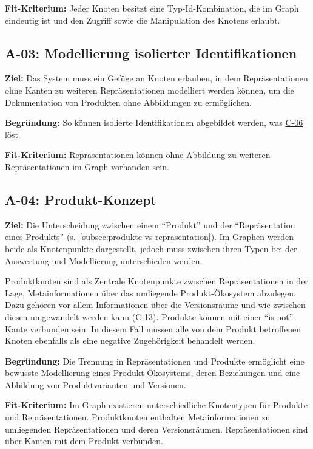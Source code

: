 \textbf{Fit-Kriterium:}
Jeder Knoten besitzt eine Typ-Id-Kombination, die im Graph eindeutig ist und den Zugriff sowie die Manipulation des Knotens erlaubt.

\subsection{A-03: Modellierung isolierter Identifikationen}\label{subsec:req-nodes-without-identification}

\textbf{Ziel:}
Das System muss ein Gefüge an Knoten erlauben, in dem Repräsentationen ohne Kanten zu weiteren Repräsentationen modelliert werden können, um die Dokumentation von Produkten ohne Abbildungen zu ermöglichen.

\textbf{Begründung:}
So können isolierte Identifikationen abgebildet werden, was \hyperref[subsec:c-06-falle-ohne-aktion-konnen-nicht-dokumentiert-werden]{C-06} löst.

\textbf{Fit-Kriterium:}
Repräsentationen können ohne Abbildung zu weiteren Repräsentationen im Graph vorhanden sein.

\subsection{A-04: Produkt-Konzept}\label{subsec:req-product-concept}

\textbf{Ziel:}
Die Unterscheidung zwischen einem \enquote{Produkt} und der \enquote{Repräsentation eines Produkts} (s.\ \autoref{subsec:produkte-vs-reprasentation}).
Im Graphen werden beide als Knotenpunkte dargestellt, jedoch muss zwischen ihren Typen bei der Auswertung und Modellierung unterschieden werden.

Produktknoten sind als Zentrale Knotenpunkte zwischen Repräsentationen in der Lage, Metainformationen über das umliegende Produkt-Ökosystem abzulegen.
Dazu gehören vor allem Informationen über die Versionsräume und wie zwischen diesen umgewandelt werden kann (\hyperref[subsec:c-13-attribut-abbildung-unzureichend]{C-13}).
Produkte können mit einer \enquote{is not}-Kante verbunden sein.
In diesem Fall müssen alle von dem Produkt betroffenen Knoten ebenfalls als eine negative Zugehörigkeit behandelt werden.

\textbf{Begründung:}
Die Trennung in Repräsentationen und Produkte ermöglicht eine bewusste Modellierung eines Produkt-Ökosystems, deren Beziehungen und eine Abbildung von Produktvarianten und Versionen.

\textbf{Fit-Kriterium:}
Im Graph existieren unterschiedliche Knotentypen für Produkte und Repräsentationen.
Produktknoten enthalten Metainformationen zu umliegenden Repräsentationen und deren Versionsräumen.
Repräsentationen sind über Kanten mit dem Produkt verbunden.

